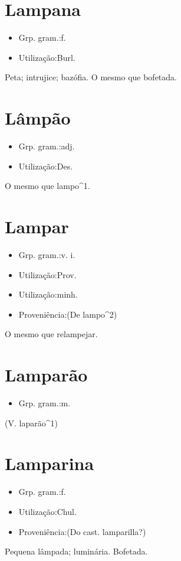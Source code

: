 \section{Lampana}
\begin{itemize}
\item {Grp. gram.:f.}
\end{itemize}
\begin{itemize}
\item {Utilização:Burl.}
\end{itemize}
Peta; intrujice; bazófia.
O mesmo que \textunderscore bofetada\textunderscore .
\section{Lâmpão}
\begin{itemize}
\item {Grp. gram.:adj.}
\end{itemize}
\begin{itemize}
\item {Utilização:Des.}
\end{itemize}
O mesmo que \textunderscore lampo\textunderscore ^1.
\section{Lampar}
\begin{itemize}
\item {Grp. gram.:v. i.}
\end{itemize}
\begin{itemize}
\item {Utilização:Prov.}
\end{itemize}
\begin{itemize}
\item {Utilização:minh.}
\end{itemize}
\begin{itemize}
\item {Proveniência:(De \textunderscore lampo\textunderscore ^2)}
\end{itemize}
O mesmo que \textunderscore relampejar\textunderscore .
\section{Lamparão}
\begin{itemize}
\item {Grp. gram.:m.}
\end{itemize}
(V. \textunderscore laparão\textunderscore ^1)
\section{Lamparina}
\begin{itemize}
\item {Grp. gram.:f.}
\end{itemize}
\begin{itemize}
\item {Utilização:Chul.}
\end{itemize}
\begin{itemize}
\item {Proveniência:(Do cast. \textunderscore lamparilla\textunderscore ?)}
\end{itemize}
Pequena lâmpada; luminária.
Bofetada.
